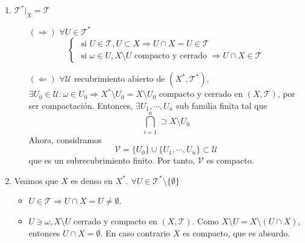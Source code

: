 \begin{dem}
\begin{enumerate}[label=(\roman*)]
\begin{enumerate}
\begin{itemize}
        \end{itemize}
    \end{enumerate}
    \item $\mathcal{T}^*|_{X} = \mathcal{T}$
      \begin{enumerate}[label=(\roman*)]
        \item [$(\Rightarrow)$] $\forall U \in \mathcal{T}^*$
          \[ 
            \begin{cases}
                \text{ si } U \in \mathcal{T}, U \subset X \Rightarrow U \cap X = U \in \mathcal{T} \\
                \text{ si } \omega \in U, X \setminus U \text{ compacto y cerrado } \Rightarrow U \cap X \in \mathcal{T}
            \end{cases} 
          \] 
        \item [$(\Leftarrow)$] $\forall \mathcal{U}$ recubrimiento abierto de $( X^*, \mathcal{T}^* )$, $ \exists U_{0} \in \mathcal{U} : \omega \in U_{0} \Rightarrow X^* \setminus U_{0} = X \setminus U_{0}$ compacto y cerrado en $( X, \mathcal{T} )$, por ser compactación. Entonces, $\exists U_{1}, \cdots, U_{n}$ sub familia finita tal que 
          \[ 
            \bigcap_{i = 1}^{n} \supset X \setminus U_{0} 
          \] 
          Ahora, considramos
          \[ 
            \mathcal{V} = \{ U_{0} \} \cup \{  U_{1}, \cdots, U_{n} \} \subset \mathcal{U}
          \] 
          que es un subrecubrimiento finito. Por tanto, $\mathcal{V}$ es compacto.
      \end{enumerate}
    \item Veamos que $X$ es denso en $X^*$. $\forall U \in \mathcal{T}^*\setminus \{  \emptyset \}$
      \begin{itemize}
        \item $U \in \mathcal{T} \Rightarrow U \cap X = U \neq \emptyset$.
        \item $U \ni \omega, X \setminus U$ cerrado y compacto en $( X, \mathcal{T} )$. Como $X \setminus U = X \setminus ( U \cap X)$, entonces $U \cap X = \emptyset$. En caso contrario $X$ es compacto, que es absurdo.
      \end{itemize}
  \end{enumerate}
\end{dem}
